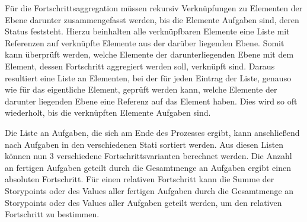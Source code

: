 Für die Fortschrittsaggregation müssen rekursiv Verknüpfungen zu Elementen der Ebene darunter zusammengefasst werden, bis die Elemente Aufgaben sind, deren Status feststeht. Hierzu beinhalten alle verknüpfbaren Elemente eine Liste mit Referenzen auf verknüpfte Elemente aus der darüber liegenden Ebene. Somit kann überprüft werden, welche Elemente der darunterliegenden Ebene mit dem Element, dessen Fortschritt aggregiert werden soll, verknüpft sind. Daraus resultiert eine Liste an Elementen, bei der für jeden Eintrag der Liste, genauso wie für das eigentliche Element, geprüft werden kann, welche Elemente der darunter liegenden Ebene eine Referenz auf das Element haben. Dies wird so oft wiederholt, bis die verknüpften Elemente Aufgaben sind.

Die Liste an Aufgaben, die sich am Ende des Prozesses ergibt, kann anschließend nach Aufgaben in den verschiedenen Stati sortiert werden. Aus diesen Listen können nun 3 verschiedene Fortschrittsvarianten berechnet werden. Die Anzahl an fertigen Aufgaben geteilt durch die Gesamtmenge an Aufgaben ergibt einen absoluten Fortschritt. Für einen relativen Fortschritt kann die Summe der Storypoints oder des Values aller fertigen Aufgaben durch die Gesamtmenge an Storypoints oder des Values aller Aufgaben geteilt werden, um den relativen Fortschritt zu bestimmen.
